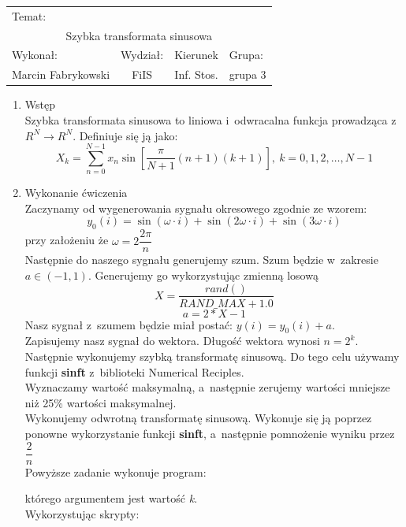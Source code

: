 \documentclass[12pt,a4paper]{article}
\begin{document}
 
\large
\begin{tabular}{|c|c|c|c|}
\hline
\multicolumn{4}{|l|}{Temat:}\\
\multicolumn{4}{|c|}{Szybka transformata sinusowa}\\
\hline
\multicolumn{1}{|l}{Wykonał:}&\multicolumn{1}{|l}{Wydział:}&\multicolumn{1}{|c}{Kierunek}&\multicolumn{1}{|l|}{Grupa:}\\
Marcin Fabrykowski&FiIS&Inf. Stos.&grupa 3\\
\hline
\end{tabular}
\normalsize
\vspace{2cm}
\begin{enumerate}
\item Wstęp\\
Szybka transformata sinusowa to liniowa i~odwracalna funkcja prowadząca z~$R^N\rightarrow R^N$. Definiuje się ją jako: $$X_k=\sum\limits_{n=0}^{N-1}x_n\sin \left[ \dfrac{\pi}{N+1}(n+1)(k+1)\right],\ k=0,1,2,\dots,N-1$$
\item Wykonanie ćwiczenia\\
Zaczynamy od wygenerowania sygnału okresowego zgodnie ze wzorem:
$$y_0(i)=\sin(\omega\cdot i)+\sin(2\omega\cdot i)+\sin(3\omega\cdot i)$$
przy założeniu że $\omega=2\dfrac{2\pi}{n}$\\
Następnie do naszego sygnału generujemy szum. Szum będzie w~zakresie $a\in(-1,1)$. Generujemy go wykorzystując zmienną losową $$X=\dfrac{rand()}{RAND\_MAX+1.0}$$
$$a=2*X-1$$
Nasz sygnał z~szumem będzie miał postać: $y(i)=y_0(i)+a$.\\
Zapisujemy nasz sygnał do wektora. Długość wektora wynosi $n=2^k$.\\
Następnie wykonujemy szybką transformatę sinusową. Do tego celu używamy funkcji \textbf{sinft} z~biblioteki Numerical Reciples.\\
Wyznaczamy wartość maksymalną, a~następnie zerujemy wartości mniejsze niż 25\% wartości maksymalnej.\\
Wykonujemy odwrotną transformatę sinusową. Wykonuje się ją poprzez ponowne wykorzystanie funkcji \textbf{sinft}, a~następnie pomnożenie wyniku przez $\dfrac{2}{n}$\\
Powyższe zadanie wykonuje program:

którego argumentem jest wartość \textit{k}.\\
Wykorzystując skrypty:\\


\end{enumerate}
\end{document}
